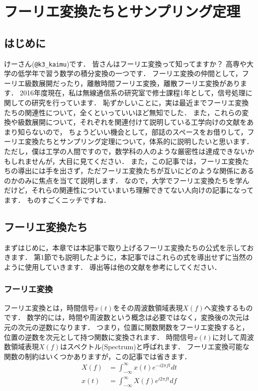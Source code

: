 
\chapter{フーリエ変換たちとサンプリング定理}

\section{はじめに}

けーさん(\verb|@k3_kaimu|)です．
皆さんはフーリエ変換って知ってますか？
高専や大学の低学年で習う数学の積分変換の一つです．
フーリエ変換の仲間として，フーリエ級数展開だったり，離散時間フーリエ変換，離散フーリエ変換があります．
2016年度現在，私は無線通信系の研究室で修士課程1年として，信号処理に関しての研究を行っています．
恥ずかしいことに，実は最近までフーリエ変換たちの関連性について，全くといっていいほど無知でした．
また，これらの変換や級数展開について，それぞれを関連付けて説明している工学向けの文献をあまり知らないので，
ちょうどいい機会として，部誌のスペースをお借りして，フーリエ変換たちとサンプリング定理について，体系的に説明したいと思います．
ただし，僕は工学の人間ですので，数学科の人のような厳密性は達成できないかもしれませんが，大目に見てください．
また，この記事では，フーリエ変換たちの導出には手を出さず，ただフーリエ変換たちが互いにどのような関係にあるのかのみに焦点を当てて説明します．
なので，大学でフーリエ変換たちを学んだけど，それらの関連性についていまいち理解できてない人向けの記事になってます．
ものすごくニッチですね．

\section{フーリエ変換たち}

まずはじめに，本章では本記事で取り上げるフーリエ変換たちの公式を示しておきます．
第1節でも説明したように，本記事ではこれらの式を導出せずに当然のように使用していきます．
導出等は他の文献を参考にしてください．

\subsection{フーリエ変換}

フーリエ変換とは，時間信号$x(t)$をその周波数領域表現$X(f)$へ変換するものです．
数学的には，時間や周波数という概念は必要ではなく，変換後の次元は元の次元の逆数になります．
つまり，位置に関数関数をフーリエ変換すると，位置の逆数を次元として持つ関数に変換されます．
時間信号$x(t)$に対して周波数領域表現$X(f)$はスペクトル(Spectrum)と呼ばれます．
フーリエ変換可能な関数の制約はいくつかありますが，この記事では省きます．
\begin{align}
X(f) &= \int_{-\infty}^{\infty} x(t) e^{-i2\pi f t} dt \\
x(t) &= \int_{-\infty}^{\infty} X(f) e^{i2\pi ft} df
\end{align}

